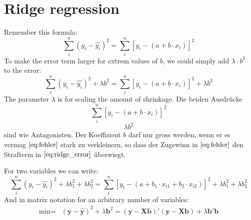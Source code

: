 \documentclass[letterpaper,10pt,english]{jupyterBook}
\begin{document}
\section{Ridge regression}
\label{\detokenize{Regression_Techniques:ridge-regression}}
\sphinxAtStartPar
Remember this formula:
\label{equation:Regression_Techniques:3f934782-64f7-4d0c-8d63-25226a80cb14}\begin{equation}
\label{eq:1}
\sum_i^{n}(y_i - \hat{y_i})^2 = \sum_i^{n}[y_i - (a + b\cdot x_i)]^{2}
\end{equation}
\sphinxAtStartPar
To make the error term larger for extrem values of \(b\), we could simply add \(\lambda\cdot b^2\) to the error:
\label{equation:Regression_Techniques:5a1cfae2-2a72-423d-b04a-4e38b261db6e}\begin{equation}
\label{eq:2}
\sum_i^{n}(y_i - \hat{y_i})^2 + \lambda b^2= \sum_i^{n}[y_i - (a + b\cdot x_i)]^{2}+ \lambda b^2
\end{equation}
\sphinxAtStartPar
The parameter \(\lambda\) is for scaling the amount of shrinkage.
Die beiden Ausdrücke
\label{equation:Regression_Techniques:83b706b3-6e7c-4cdc-b6c8-78a64ef4307b}\begin{equation}
\label{eq:fehler}
\sum_i^{n}[y_i - (a + b\cdot x_i)]^{2}
\end{equation}\label{equation:Regression_Techniques:57f9289f-9dde-455e-93df-788940b66ab6}\begin{equation}
\label{eq:ridge_error}
\lambda b^2
\end{equation}
\sphinxAtStartPar
sind wie Antagonisten. Der Koeffizient \(b\) darf nur gross werden, wenn er es vermag \(\eqref{eq:fehler}\) stark zu verkleinern, so dass der Zugewinn in \(\eqref{eq:fehler}\) den Strafterm in \(\eqref{eq:ridge_error}\) überwiegt.

\sphinxAtStartPar
For two variables we can write:
\begin{equation*}\sum_i^{n}(y_i - \hat{y_i})^2 + \lambda b_1^2 + \lambda b_2^2= \sum_i^{n}[y_i - (a + b_1\cdot x_{i1} + b_2\cdot x_{i2})]^{2}+ \lambda b_1^2 + \lambda b_2^2\end{equation*}
\sphinxAtStartPar
And in matrix notation for an arbitrary number of variables:
\begin{align*}
    \text{min}=&(\mathbf{y}-\hat{\mathbf{y}})^2 + \lambda \mathbf{b}^2=(\mathbf{y}-\mathbf{X}\mathbf{b})'(\mathbf{y}-\mathbf{X}\mathbf{b}) + \lambda \mathbf{b}'\mathbf{b}
\end{align*}
\end{document}
